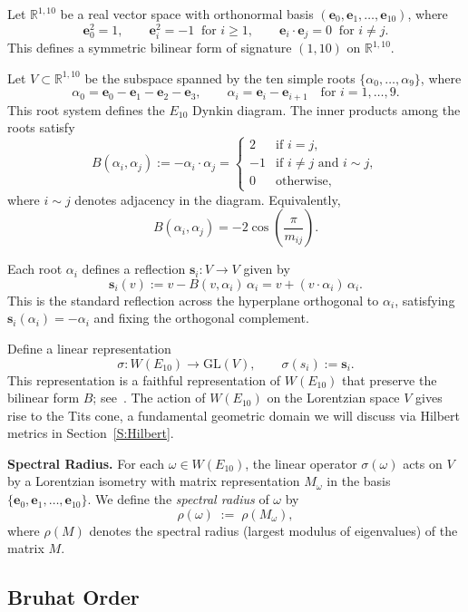 \documentclass[11pt]{amsart}
\numberwithin{equation}{section}
\newcommand{\vs}{\mathbf{s}}
\newcommand{\vve}{\mathbf{e}}
\begin{document}
\medskip
Let \(\mathbb{R}^{1,10}\) be a real vector space with orthonormal basis \((\vve_0, \vve_1, \dots, \vve_{10})\), where
\[
\vve_0^2 = 1, \qquad \vve_i^2 = -1 \;\; \text{for } i \ge 1, \qquad \vve_i \cdot \vve_j = 0 \;\; \text{for } i \ne j.
\]
This defines a symmetric bilinear form of signature \((1,10)\) on \(\mathbb{R}^{1,10}\).

Let \(V \subset \mathbb{R}^{1,10}\) be the subspace spanned by the ten simple roots \(\{ \alpha_0, \dots, \alpha_9 \}\), where
\[
\alpha_0 = \vve_0 - \vve_1 - \vve_2 - \vve_3, \qquad \alpha_i = \vve_i - \vve_{i+1} \quad \text{for } i = 1,\dots,9.
\]
This root system defines the \(E_{10}\) Dynkin diagram. The inner products among the roots satisfy
\[
B(\alpha_i, \alpha_j) := -\alpha_i \cdot \alpha_j = 
\begin{cases}
2 & \text{if } i = j, \\
-1 & \text{if } i \ne j \text{ and } i \sim j, \\
0 & \text{otherwise},
\end{cases}
\]
where \(i \sim j\) denotes adjacency in the diagram. Equivalently,
\[
B(\alpha_i, \alpha_j) = -2 \cos \left( \frac{\pi}{m_{ij}} \right).
\]

Each root \(\alpha_i\) defines a reflection \(\vs_i : V \to V\) given by
\[
\vs_i(v) := v - B(v, \alpha_i)\,\alpha_i = v + (v \cdot \alpha_i)\, \alpha_i.
\]
This is the standard reflection across the hyperplane orthogonal to \(\alpha_i\), satisfying \(\vs_i(\alpha_i) = -\alpha_i\) and fixing the orthogonal complement.

\medskip
\noindent
Define a linear representation
\[
\sigma : W(E_{10}) \to \mathrm{GL}(V), \qquad \sigma(s_i) := \vs_i.
\]
This representation is a faithful representation of \(W(E_{10})\) that preserve the bilinear form \(B\); see~\cite[Cor.~5.4]{Humphreys1990}. The action of $W(E_{10})$ on the Lorentzian space $V$ gives rise to the Tits cone, a fundamental geometric domain we will discuss via Hilbert metrics in Section~\ref{S:Hilbert}.

\medskip
\noindent\textbf{Spectral Radius.}
For each \(\omega \in W(E_{10})\), the linear operator \(\sigma(\omega)\) acts on \(V\) by a Lorentzian isometry with matrix representation \(M_\omega\) in the basis \(\{ \vve_0, \vve_1, \dots, \vve_{10} \}\). We define the \emph{spectral radius} of \(\omega\) by
\[
\rho(\omega) \;:=\; \rho(M_\omega),
\]
where \(\rho(M)\) denotes the spectral radius (largest modulus of eigenvalues) of the matrix \(M\).

\subsection{Bruhat Order}\label{SS:bruhat}
\end{document}
